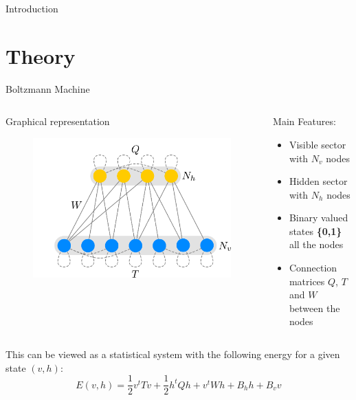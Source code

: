 \documentclass[10pt]{beamer}
\begin{document}
\begin{frame}{Introduction}
\begin{figure}
\begin{center}
        \end{center}
    \end{figure}
\end{frame}
\section{Theory}

\begin{frame}{{Boltzmann Machine}}
    \begin{columns}
        \begin{column}[]{0.5 \textwidth}

            Graphical representation
            \begin{figure}
                \includegraphics[width=\textwidth]{figures/rtbm.pdf}
            \end{figure}
        \end{column}
        \begin{column}[]{0.5 \textwidth}
            Main Features:
            \begin{itemize} 
                \item Visible sector with $N_v$ nodes
                \item Hidden sector with $N_h$ nodes
                \item Binary valued states \textbf{\{0,1\}} all the nodes
                \item Connection matrices $Q$, $T$ and $W$ between the nodes
            \end{itemize}
        \end{column}
    \end{columns}
    This can be viewed as a statistical system with the following energy for a given state $(v, h)$:
    \begin{equation*}
        E(v, h) = \frac{1}{2} v^t T v + \frac{1}{2} h^t Q h + v^t W h + B_h h + B_v v
    \end{equation*}

    
    
\end{frame}
\end{document}
